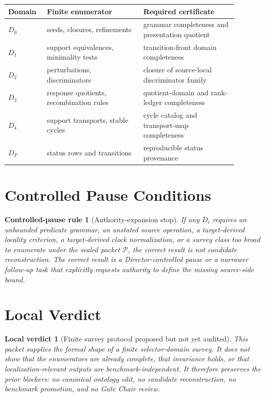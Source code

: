 \documentclass[11pt]{article}
\newcommand{\Pack}{\mathcal{P}}
\newtheorem{pauserule}{Controlled-pause rule}
\newtheorem{verdict}{Local verdict}
\begin{document}
\begin{center}
\begin{tabular}{p{0.14\linewidth}p{0.38\linewidth}p{0.37\linewidth}}
\textbf{Domain} & \textbf{Finite enumerator} & \textbf{Required certificate} \\
\hline
\(D_0\) & seeds, closures, refinements & grammar completeness and presentation quotient \\
\(D_1\) & support equivalences, minimality tests & transition-front domain completeness \\
\(D_2\) & perturbations, discriminators & closure of source-local discriminator family \\
\(D_3\) & response quotients, recombination rules & quotient-domain and rank-ledger completeness \\
\(D_4\) & support transports, stable cycles & cycle catalog and transport-map completeness \\
\(D_F\) & status rows and transitions & reproducible status provenance \\
\end{tabular}
\end{center}

\section{Controlled Pause Conditions}

\begin{pauserule}[Authority-expansion stop]
If any \(D_i\) requires an unbounded predicate grammar, an unstated source
operation, a target-derived locality criterion, a target-derived clock
normalization, or a survey class too broad to enumerate under the sealed
packet \(\Pack\), the correct result is not candidate reconstruction. The
correct result is a Director-controlled pause or a narrower follow-up task
that explicitly requests authority to define the missing source-side bound.
\end{pauserule}

\section{Local Verdict}

\begin{verdict}[Finite survey protocol proposed but not yet audited]
This packet supplies the formal shape of a finite selector-domain survey. It
does not show that the enumerators are already complete, that invariance
holds, or that localization-relevant outputs are benchmark-independent. It
therefore preserves the prior blockers: no canonical ontology edit, no
candidate reconstruction, no benchmark promotion, and no Gate Chair review.
\end{verdict}
\end{document}
